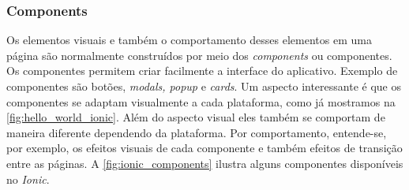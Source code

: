 \subsubsection{Components}

Os elementos visuais e também o comportamento desses elementos em uma página
são normalmente construídos por meio dos \textit{components} ou componentes.
Os componentes permitem criar facilmente a interface do aplicativo. Exemplo de
componentes são botões, \textit{modals, popup} e \textit{cards}. Um aspecto interessante é que
os componentes se adaptam visualmente a cada plataforma, como já mostramos na \autoref{fig:hello_world_ionic}.
Além do aspecto visual eles também se comportam de maneira diferente dependendo da plataforma.
Por comportamento, entende-se, por exemplo, os efeitos visuais de cada componente e também efeitos
de  transição entre as páginas. A \autoref{fig:ionic_components} ilustra alguns componentes
disponíveis no \textit{Ionic}.

